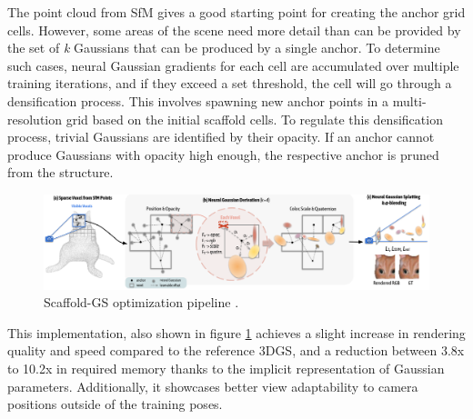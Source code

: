 The point cloud from SfM gives a good starting point for creating the anchor grid cells. However, some areas of the scene need more detail than can be provided by the set of \textit{k} Gaussians that can be produced by a single anchor. To determine such cases, neural Gaussian gradients for each cell are accumulated over multiple training iterations, and if they exceed a set threshold, the cell will go through a densification process. This involves spawning new anchor points in a multi-resolution grid based on the initial scaffold cells. To regulate this densification process, trivial Gaussians are identified by their opacity. If an anchor cannot produce Gaussians with opacity high enough, the respective anchor is pruned from the structure.

\begin{figure}[H]
    \centering
    \includegraphics[width=0.8\linewidth]{figures/scaffoldgs.png}
    \caption{Scaffold-GS optimization pipeline \cite{scaffoldgs}.}
    \label{fig:scaffold}
\end{figure}

This implementation, also shown in figure \ref{fig:scaffold} achieves a slight increase in rendering quality and speed compared to the reference 3DGS, and a reduction between 3.8x to 10.2x in required memory thanks to the implicit representation of Gaussian parameters. Additionally, it showcases better view adaptability to camera positions outside of the training poses.

